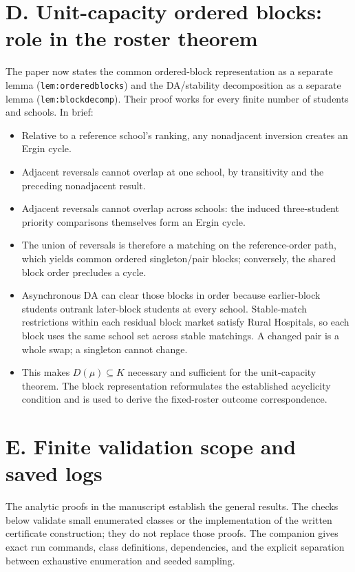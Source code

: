 \documentclass[a4paper,11pt]{article}
\begin{document}
\section*{D. Unit-capacity ordered blocks: role in the roster theorem}
The paper now states the common ordered-block representation as a separate lemma (\texttt{lem:orderedblocks}) and the DA/stability decomposition as a separate lemma (\texttt{lem:blockdecomp}). Their proof works for every finite number of students and schools. In brief:


\begin{itemize}[leftmargin=*,itemsep=0.25em,topsep=0.25em]
\item Relative to a reference school's ranking, any nonadjacent inversion creates an Ergin cycle.
\item Adjacent reversals cannot overlap at one school, by transitivity and the preceding nonadjacent result.
\item Adjacent reversals cannot overlap across schools: the induced three-student priority comparisons themselves form an Ergin cycle.
\item The union of reversals is therefore a matching on the reference-order path, which yields common ordered singleton/pair blocks; conversely, the shared block order precludes a cycle.
\item Asynchronous DA can clear those blocks in order because earlier-block students outrank later-block students at every school. Stable-match restrictions within each residual block market satisfy Rural Hospitals, so each block uses the same school set across stable matchings. A changed pair is a whole swap; a singleton cannot change.
\item This makes \ensuremath{D(\mu)\subseteq{}K} necessary and sufficient for the unit-capacity theorem. The block representation reformulates the established acyclicity condition and is used to derive the fixed-roster outcome correspondence.
\end{itemize}


\section*{E. Finite validation scope and saved logs}
The analytic proofs in the manuscript establish the general results. The checks below validate small enumerated classes or the implementation of the written certificate construction; they do not replace those proofs. The companion  gives exact run commands, class definitions, dependencies, and the explicit separation between exhaustive enumeration and seeded sampling.
\end{document}
